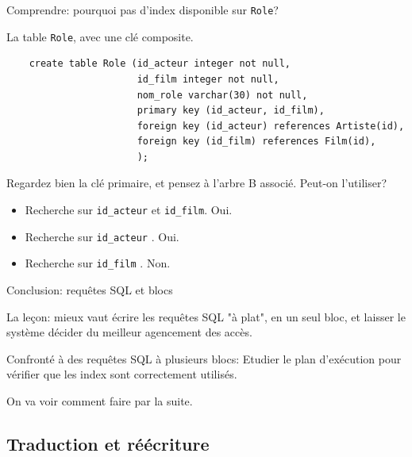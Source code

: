 \begin{frame}[fragile]{Comprendre: pourquoi pas d'index disponible sur \texttt{Role}?}

La table \texttt{Role}, avec une clé composite.
\vfill
\begin{verbatim}
    create table Role (id_acteur integer not null,
                       id_film integer not null,
                       nom_role varchar(30) not null,
                       primary key (id_acteur, id_film),
                       foreign key (id_acteur) references Artiste(id),
                       foreign key (id_film) references Film(id),                            
                       );
\end{verbatim}

\vfill

Regardez bien la clé primaire, et pensez à l'arbre B associé. \alert{Peut-on l'utiliser?}

\begin{itemize}
  \item Recherche sur \texttt{id\_acteur} et \texttt{id\_film}. \alert{Oui}.
  \item Recherche sur \texttt{id\_acteur} . \alert{Oui}.
  \item Recherche sur \texttt{id\_film} . \alert{Non}.  
\end{itemize}
\end{frame}



\begin{frame}[fragile]{Conclusion: requêtes SQL et blocs}

La leçon: mieux vaut écrire les requêtes SQL "à plat", en un seul bloc, 
\alert{et laisser le système décider du meilleur agencement des accès}.

\vfill

Confronté à des requêtes SQL à plusieurs blocs: \alert{Etudier le plan d'exécution
pour vérifier que les index sont correctement utilisés}.

\vfill

On va voir comment faire par la suite.
\end{frame}

\subsection{Traduction et réécriture}


